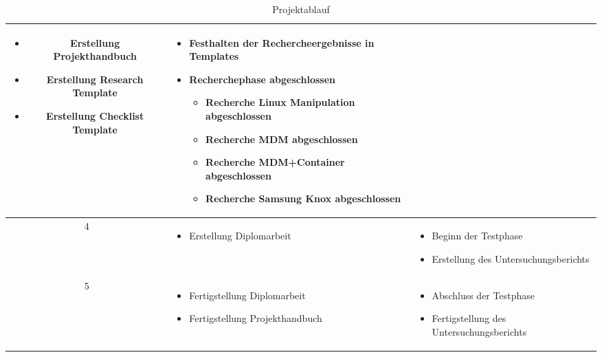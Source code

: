 \begin{table}[H]
\begin{tabular}{| c | p{6.5cm} | p{7.5cm} |}
		\begin{itemize}
			\item Erstellung Projekthandbuch
			\item Erstellung Research Template
			\item Erstellung Checklist Template
		\end{itemize}
		&%
		\begin{itemize}
			\item Festhalten der Rechercheergebnisse in Templates
			\item Recherchephase abgeschlossen
			\begin{itemize}
				\item Recherche Linux Manipulation abgeschlossen
				\item Recherche MDM abgeschlossen
				\item Recherche MDM+Container abgeschlossen
				\item Recherche Samsung Knox abgeschlossen
			\end{itemize}
		\end{itemize}
		\\\hline %
		4
		&%
		\begin{itemize}
			\item Erstellung Diplomarbeit
		\end{itemize}
		&%
		\begin{itemize}
			\item Beginn der Testphase
			\item Erstellung des Untersuchungsberichts
		\end{itemize}
		\\\hline %
		5
		&%
		\begin{itemize}
			\item Fertigstellung Diplomarbeit
			\item Fertigstellung Projekthandbuch
		\end{itemize}
		&%
		\begin{itemize}
			\item Abschluss der Testphase
			\item Fertigstellung des Untersuchungsberichts
		\end{itemize}
		\\\hline %
	\end{tabular}
	\caption{Projektablauf}
\end{table}

\newpage

